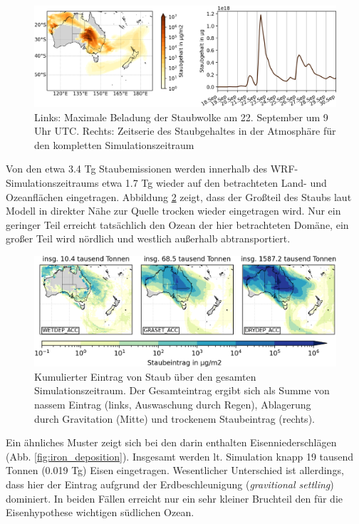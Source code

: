 \documentclass[12pt,a4paper,onecolumn]{scrartcl}
\begin{document}
\begin{figure}[!htb]
\includegraphics[width=\textwidth]{bilder/dustload_time.png}
\caption{Links: Maximale Beladung der Staubwolke am 22. September um 9 Uhr UTC. Rechts: Zeitserie des Staubgehaltes in der Atmosphäre für den kompletten Simulationszeitraum} \label{fig:dustload_time}
\end{figure}
Von den etwa 3.4 Tg Staubemissionen werden innerhalb des WRF-Simulationszeitraums etwa 1.7 Tg wieder auf den betrachteten Land- und Ozeanflächen eingetragen. Abbildung \ref{fig:deposition} zeigt, dass der Großteil des Staubs laut Modell in direkter Nähe zur Quelle trocken wieder eingetragen wird. Nur ein geringer Teil erreicht tatsächlich den Ozean der hier betrachteten Domäne, ein großer Teil wird nördlich und westlich außerhalb abtransportiert. 
\begin{figure}[!htb]
\includegraphics[width=\textwidth]{bilder/dust_deposition_vars.png}
\caption{Kumulierter Eintrag von Staub über den gesamten Simulationszeitraum. Der Gesamteintrag ergibt sich als Summe von nassem Eintrag (links, Auswaschung durch Regen), Ablagerung durch Gravitation (Mitte) und trockenem Staubeintrag (rechts).} \label{fig:deposition}
\end{figure}
Ein ähnliches Muster zeigt sich bei den darin enthalten Eisenniederschlägen (Abb. \ref{fig:iron_deposition}). Insgesamt werden lt. Simulation knapp 19 tausend Tonnen (0.019 Tg) Eisen eingetragen. Wesentlicher Unterschied ist allerdings, dass hier der Eintrag aufgrund der Erdbeschleunigung (\textit{gravitional settling}) dominiert.  In beiden Fällen erreicht nur ein sehr kleiner Bruchteil den für die Eisenhypothese wichtigen südlichen Ozean.
\end{document}
